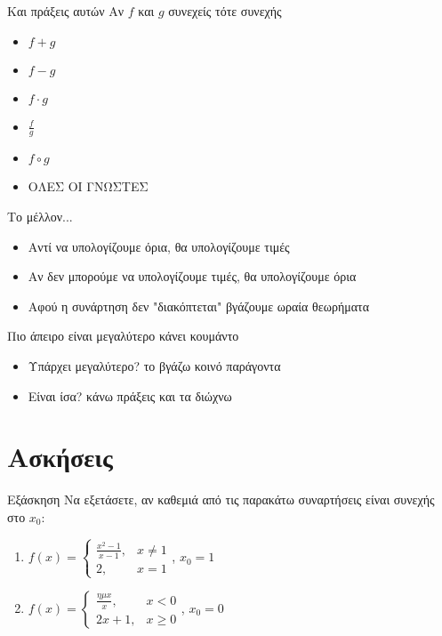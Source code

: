 \documentclass[greek]{beamer}
\begin{document}
\begin{frame}{Και πράξεις αυτών}
 Αν $f$ και $g$ συνεχείς τότε συνεχής
 \begin{itemize}
  \item $f+g$ \pause
  \item $f-g$ \pause
  \item $f\cdot g$ \pause
  \item $\frac{f}{g}$ \pause
  \item $f\circ g$ \pause
  \item ΟΛΕΣ ΟΙ ΓΝΩΣΤΕΣ
 \end{itemize}
\end{frame}

\begin{frame}{Το μέλλον...}
 \begin{itemize}
  \item Αντί να υπολογίζουμε όρια, θα υπολογίζουμε τιμές \pause
  \item Αν δεν μπορούμε να υπολογίζουμε τιμές, θα υπολογίζουμε όρια \pause
  \item Αφού η συνάρτηση δεν "διακόπτεται" βγάζουμε ωραία θεωρήματα
 \end{itemize}
\end{frame}

\begin{frame}{Πιο άπειρο είναι μεγαλύτερο κάνει κουμάντο}
 \begin{itemize}
  \item Υπάρχει μεγαλύτερο? το βγάζω κοινό παράγοντα
  \item Είναι ίσα? κάνω πράξεις και τα διώχνω
 \end{itemize}
\end{frame}

\section{Ασκήσεις}
\begin{frame}{Εξάσκηση}
 Να εξετάσετε, αν καθεμιά από τις παρακάτω συναρτήσεις είναι συνεχής στο $x_0$:
 \begin{enumerate}
  \item $f(x)=\begin{cases}
          \frac{x^2-1}{x-1}, & x\ne 1 \\
          2,                 & x=1
         \end{cases}$, $x_0=1$ \pause
  \item $f(x)=\begin{cases}
          \frac{ημx}{x}, & x<0    \\
          2x+1,          & x\ge 0
         \end{cases}$, $x_0=0$
 \end{enumerate}
\end{frame}
\end{document}
